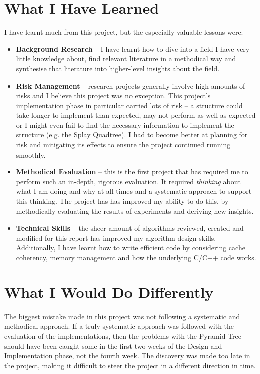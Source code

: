 \section{What I Have Learned}

I have learnt much from this project, but the especially valuable lessons were:
\begin{itemize}
	\item \textbf{Background Research} -- I have learnt how to dive into a field I have very little knowledge about, find relevant literature in a methodical way and synthesise that literature into higher-level insights about the field.
	\item \textbf{Risk Management} -- research projects generally involve high amounts of risks and I believe this project was no exception. This project's implementation phase in particular carried lots of risk -- a structure could take longer to implement than expected, may not perform as well as expected or I might even fail to find the necessary information to implement the structure (e.g. the Splay Quadtree). I had to become better at planning for risk and mitigating its effects to ensure the project continued running smoothly.
	\item \textbf{Methodical Evaluation} -- this is the first project that has required me to perform such an in-depth, rigorous evaluation. It required \textit{thinking} about what I am doing and why at all times and a systematic approach to support this thinking. The project has has improved my ability to do this, by methodically evaluating the results of experiments and deriving new insights.
	\item \textbf{Technical Skills} -- the sheer amount of algorithms reviewed, created and modified for this report has improved my algorithm design skills. Additionally, I have learnt how to write efficient code by considering cache coherency, memory management and how the underlying C/C++ code works.
\end{itemize}

\section{What I Would Do Differently}

The biggest mistake made in this project was not following a systematic and methodical approach. If a truly systematic approach was followed with the evaluation of the implementations, then the problems with the Pyramid Tree should have been caught some in the first two weeks of the Design and Implementation phase, not the fourth week. The discovery was made too late in the project, making it difficult to steer the project in a different direction in time.

